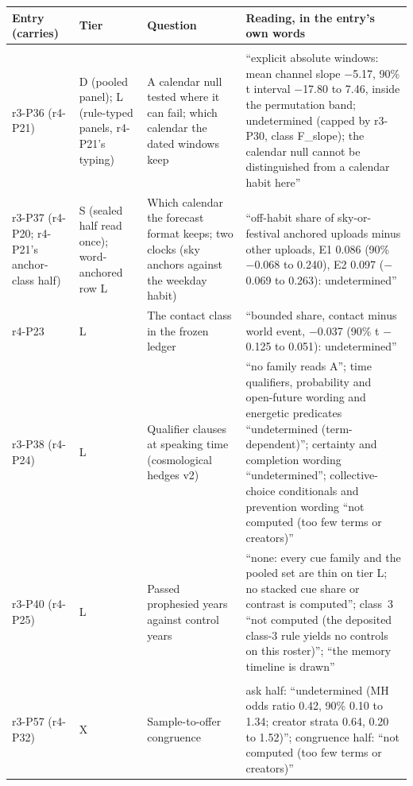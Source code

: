 \begin{table}[tp]
\centering
\footnotesize
\begin{tabular}{@{}>{\raggedright\arraybackslash}p{}>{\raggedright\arraybackslash}p{}>{\raggedright\arraybackslash}p{}p{}@{}}
\toprule
Entry (carries) & Tier & Question & Reading, in the entry's own words \\
\midrule
\multicolumn{4}{@{}l}{\emph{Step~3: forecasts and time}} \\
r3-P36 (r4-P21) & D (pooled panel); L (rule-typed panels, r4-P21's typing) & A calendar null tested where it can fail;
which calendar the dated windows keep & ``explicit absolute windows: mean channel slope $-$5.17, 90\% t interval
$-$17.80 to 7.46, inside the permutation band; undetermined (capped by r3-P30, class F\_slope); the calendar null cannot
be distinguished from a calendar habit here'' \\
r3-P37 (r4-P20; r4-P21's anchor-class half) & S (sealed half read once); word-anchored row L & Which calendar the
forecast format keeps; two clocks (sky anchors against the weekday habit) & ``off-habit share of sky-or-festival
anchored uploads minus other uploads, E1 0.086 (90\% $-$0.068 to 0.240), E2 0.097 ($-$0.069 to 0.263):
undetermined'' \\
r4-P23 & L & The contact class in the frozen ledger & ``bounded share, contact minus world event, $-$0.037 (90\% t
$-$0.125 to 0.051): undetermined'' \\
r3-P38 (r4-P24) & L & Qualifier clauses at speaking time (cosmological hedges v2) & ``no family reads A''; time
qualifiers, probability and open-future wording and energetic predicates ``undetermined (term-dependent)''; certainty
and completion wording ``undetermined''; collective-choice conditionals and prevention wording ``not computed (too few
terms or creators)'' \\
r3-P40 (r4-P25) & L & Passed prophesied years against control years & ``none: every cue family and the pooled set are
thin on tier L; no stacked cue share or contrast is computed''; class~3 ``not computed (the deposited class-3 rule
yields no controls on this roster)''; ``the memory timeline is drawn'' \\
\midrule
\multicolumn{4}{@{}l}{\emph{Step~4: the platform and the audience}} \\
r3-P57 (r4-P32) & X & Sample-to-offer congruence & ask half: ``undetermined (MH odds ratio 0.42, 90\% 0.10 to 1.34;
creator strata 0.64, 0.20 to 1.52)''; congruence half: ``not computed (too few terms or creators)'' \\

\end{tabular}
\end{table}
